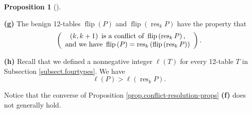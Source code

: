 \documentclass[numbers=enddot,12pt,final,onecolumn,notitlepage]{scrartcl}%
\theoremstyle{definition}
\newtheorem{prop}[theo]{Proposition}
\newenvironment{proposition}[1][]
{\begin{prop}[#1]\begin{leftbar}}
{\end{leftbar}\end{prop}}
\begin{document}
\begin{proposition}
\textbf{(g)} The benign 12-tables $\operatorname*{flip}\left(  P\right)  $ and
$\operatorname*{flip}\left(  \operatorname*{res}\nolimits_{k}P\right)  $ have
the property that%
\begin{equation}
\left(
\begin{array}
[c]{c}%
\left(  k,k+1\right)  \text{ is a conflict of }\operatorname*{flip}\left(
\operatorname*{res}\nolimits_{k}P\right)  \text{,}\\
\text{and we have }\operatorname*{flip}\left(  P\right)  =\operatorname*{res}%
\nolimits_{k}\left(  \operatorname*{flip}\left(  \operatorname*{res}%
\nolimits_{k}P\right)  \right)
\end{array}
\right)  . \label{pf.lem.BK.res.flip}%
\end{equation}


\textbf{(h)} Recall that we defined a nonnegative integer $\ell\left(
T\right)  $ for every 12-table $T$ in Subsection \ref{subsect.fourtypes}. We
have
\begin{equation}
\ell\left(  P\right)  >\ell\left(  \operatorname*{res}\nolimits_{k}P\right)  .
\label{pf.lem.BK.res.lendec}%
\end{equation}

\end{proposition}

Notice that the converse of Proposition \ref{prop.conflict-resolution-props}
\textbf{(f)} does not generally hold.
\end{document}
